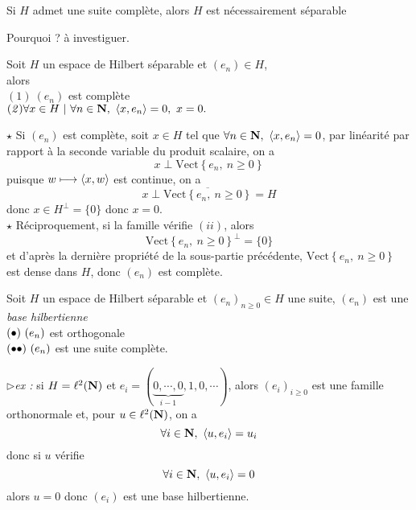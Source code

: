 \documentclass[a4paper,11pt, twoside]{article}
\begin{document}
\begin{RQ}
  Si $H$ admet une suite complète, alors $H$ est nécessairement séparable
\end{RQ}


\begin{Proof}
  Pourquoi ? à investiguer.
\end{Proof}


\begin{prop}
  Soit $H$ un espace de Hilbert séparable et $(e_n)\in H$,\\

  alors \lasse\\
  $(\mathit 1)\ (e_n)$ est complète\\
  $(\mathit 2)\forall x\in H\TQ \forall n\in\N,\ \ps{x,e_n}=0,\ x=0.$
\end{prop}


\begin{Proof}
  $\star$ Si $(e_n)$ est complète, soit $x\in H$ tel que $\forall n\in \N,\ \ps{x,e_n}=0$, par linéarité par rapport à la seconde variable du produit scalaire, on a 
  $$x\perp\mathrm{Vect}\left\{e_n,\ n\geqslant 0\right\}$$
  puisque $w\longmapsto\left\langle x,w \right\rangle$ est continue, on a 
  $$x\perp\overline{\mathrm{Vect}\left\{e_n,\ n\geqslant 0\right\}}=H$$
  donc $x\in H^\bot=\{0\}$ donc $x=0$.\\

  $\star$ Réciproquement, si la famille vérifie $(ii)$, alors 
  $$\mathrm{Vect}\left\{e_n,\ n\geqslant 0\right\}^\bot=\{0\}$$
  et d'après la dernière propriété de la sous-partie précédente, $\mathrm{Vect}\left\{e_n,\ n\geqslant 0\right\}$ est dense dans $H$, donc $(e_n)$ est complète.
\end{Proof}


\begin{Def}
  Soit $H$ un espace de Hilbert séparable et $(e_n)_{n\geqslant 0}\in H$ une suite, $(e_n)$ est une \emph{base hilbertienne} \ssi\\
  $(\bullet)\ (e_n)$ est orthogonale\\
  $(\bullet\bullet)\ (e_n)$ est une suite complète.
\end{Def}


$\triangleright$\emph{ex : }si $H=\ell^2(\mathbf N)$ et $e_i=(\underbrace{0,\cdots,0}_{i-1},1,0,\cdots)$, alors $(e_i)_{i\geqslant 0}$ est une famille orthonormale et, pour $u\in\ell^2(\mathbf N)$, on a 
$$\forall i\in \mathbf N,\ \left\langle u,e_i \right\rangle=u_i$$
donc si $u$ vérifie 
$$\forall i\in \N,\ \ps{u,e_i}=0$$
alors $u=0$ donc $(e_i)$ est une base hilbertienne.
\end{document}
